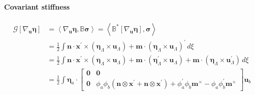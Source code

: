 \paragraph{Covariant stiffness} %
\begin{equation*} 
  \begin{aligned}
  \mathcal{G}\left[\nabla_{\bm{u}} \bm{\eta}\right]
  &= \left<\nabla_{\bm{u}} \bm{\eta}, \mathbb{B}\bm{\sigma}\right>
   = \left<\mathbb{B}^* \left[\nabla_{\bm{u}} \bm{\eta}\right], \bm{\sigma}\right> \\
  &=\frac{1}{2} \int \bm{n} \cdot \bm{x}^{\prime} \times(\bm{\eta}_{\scriptscriptstyle{\Lambda}} \times \bm{u}_{\scriptscriptstyle{\Lambda}})+\bm{m} \cdot(\bm{\eta}_{\scriptscriptstyle{\Lambda}} \times \bm{u}_{\scriptscriptstyle{\Lambda}})^{\prime} \, d \xi 
  \\
  &=\frac{1}{2} \int \bm{n} \cdot \bm{x}^{\prime} \times(\bm{\eta}_{\scriptscriptstyle{\Lambda}} \times \bm{u}_{\scriptscriptstyle{\Lambda}})
  +\bm{m} \cdot(\bm{\eta}_{\scriptscriptstyle{\Lambda}}^{\prime} \times \bm{u}_{\scriptscriptstyle{\Lambda}}) 
  +\bm{m} \cdot(\bm{\eta}_{\scriptscriptstyle{\Lambda}} \times \bm{u}_{\scriptscriptstyle{\Lambda}}^\prime)\, d \xi \\
  &= \frac{1}{2}\int \bm{\eta}_a \cdot \begin{bmatrix}
    \mathbf{0} & \mathbf{0} \\
    \mathbf{0} & \phi_a \phi_b \left(\bm{n}\otimes\bm{x}^\prime + \bm{n}\otimes\bm{x}^\prime\right)
                    +\phi_a^\prime \phi_b \bm{m}^\times
                    -\phi_a \phi_b^\prime \bm{m}^\times
  \end{bmatrix}\bm{u}_b
  \end{aligned}
\end{equation*}
 

